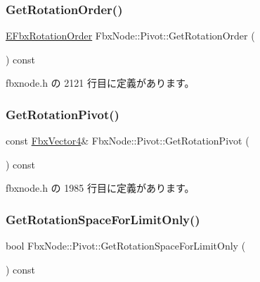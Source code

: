 \subsubsection{\texorpdfstring{Get\+Rotation\+Order()}{GetRotationOrder()}}
{\footnotesize\ttfamily \hyperlink{fbxmath_8h_ae46778666b56bb0abe5992b855fe9332}{E\+Fbx\+Rotation\+Order} Fbx\+Node\+::\+Pivot\+::\+Get\+Rotation\+Order (\begin{DoxyParamCaption}{ }\end{DoxyParamCaption}) const\hspace{0.3cm}{\ttfamily [inline]}}



 fbxnode.\+h の 2121 行目に定義があります。

\mbox{\label{class_fbx_node_1_1_pivot_af2640c863b393ec2540100d414ce8127}} 
\subsubsection{\texorpdfstring{Get\+Rotation\+Pivot()}{GetRotationPivot()}}
{\footnotesize\ttfamily const \hyperlink{class_fbx_vector4}{Fbx\+Vector4}\& Fbx\+Node\+::\+Pivot\+::\+Get\+Rotation\+Pivot (\begin{DoxyParamCaption}{ }\end{DoxyParamCaption}) const\hspace{0.3cm}{\ttfamily [inline]}}



 fbxnode.\+h の 1985 行目に定義があります。

\mbox{\label{class_fbx_node_1_1_pivot_a1dce9501d09b1953b4dc5c97a0517b9f}} 
\subsubsection{\texorpdfstring{Get\+Rotation\+Space\+For\+Limit\+Only()}{GetRotationSpaceForLimitOnly()}}
{\footnotesize\ttfamily bool Fbx\+Node\+::\+Pivot\+::\+Get\+Rotation\+Space\+For\+Limit\+Only (\begin{DoxyParamCaption}{ }\end{DoxyParamCaption}) const\hspace{0.3cm}{\ttfamily [inline]}}



